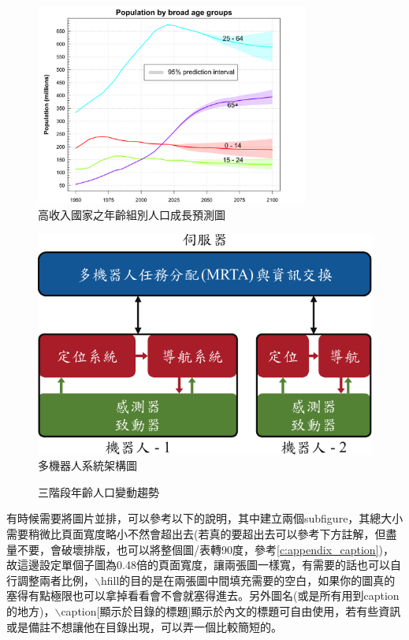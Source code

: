 \begin{figure}[htbp]
    \centering
    \includegraphics[width=0.8\textwidth]{figsrc/ch01/high_income_population_by_age_groups.png}
    \caption{高收入國家之年齡組別人口成長預測圖\cite{nations2019world}}
    \label{fig:population_age_world}
\end{figure}

\begin{figure}[htbp]
    \centering
    \includegraphics{figsrc/ch01/mrs_framework_zh.pdf}
    \caption{多機器人系統架構圖}
    \label{fig:mrs_framework}
\end{figure}

\begin{figure}[htbp]
    \centering
    
    \caption{三階段年齡人口變動趨勢\cite{國發會年齡人口變動趨勢}}
    \label{fig:population_age_taiwan}
\end{figure}

有時候需要將圖片並排，可以參考以下的說明，其中建立兩個subfigure，其總大小需要稍微比頁面寬度略小不然會超出去(若真的要超出去可以參考下方註解，但盡量不要，會破壞排版，也可以將整個圖/表轉90度，參考\cref{c:appendix_caption})，故這邊設定單個子圖為0.48倍的頁面寬度，讓兩張圖一樣寬，有需要的話也可以自行調整兩者比例，$\backslash$hfill的目的是在兩張圖中間填充需要的空白，如果你的圖真的塞得有點極限也可以拿掉看看會不會就塞得進去。另外圖名(或是所有用到caption的地方)，$\backslash$caption[顯示於目錄的標題]{顯示於內文的標題}可自由使用，若有些資訊或是備註不想讓他在目錄出現，可以弄一個比較簡短的。

